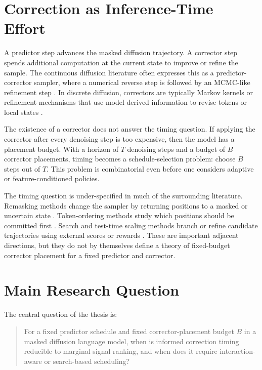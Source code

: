 \section{Correction as Inference-Time Effort}
\label{sec:ch1-correction-effort}

A predictor step advances the masked diffusion trajectory. A corrector step
spends additional computation at the current state to improve or refine the
sample. The continuous diffusion literature often expresses this as a
predictor-corrector sampler, where a numerical reverse step is followed by an
MCMC-like refinement step \parencite{song2021score}. In discrete diffusion,
correctors are typically Markov kernels or refinement mechanisms that use
model-derived information to revise tokens or local states
\parencite{zhao2024informedcorrectors,gat2024dfm,schiff2026proseco}.

The existence of a corrector does not answer the timing question. If applying
the corrector after every denoising step is too expensive, then the model has a
placement budget. With a horizon of $T$ denoising steps and a budget of $B$
corrector placements, timing becomes a schedule-selection problem: choose
$B$ steps out of $T$. This problem is combinatorial even before one considers
adaptive or feature-conditioned policies.

The timing question is under-specified in much of the surrounding literature.
Remasking methods change the sampler by returning positions to a masked or
uncertain state \parencite{wang2025remdm}. Token-ordering methods study which
positions should be committed first \parencite{kim2025tokenordering}. Search
and test-time scaling methods branch or refine candidate trajectories using
external scores or rewards \parencite{lee2025iterref,bilal2026s3}. These are
important adjacent directions, but they do not by themselves define a theory
of fixed-budget corrector placement for a fixed predictor and corrector.

\section{Main Research Question}
\label{sec:ch1-research-question}

The central question of the thesis is:
\begin{quote}
For a fixed predictor schedule and fixed corrector-placement budget $B$ in a
masked diffusion language model, when is informed correction timing reducible
to marginal signal ranking, and when does it require interaction-aware or
search-based scheduling?
\end{quote}

